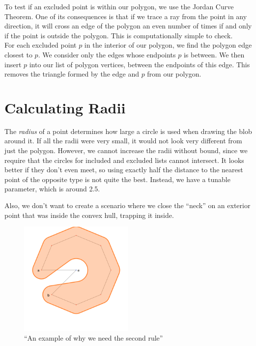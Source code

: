 \documentclass[paper=a4, fontsize=11pt]{scrartcl} %
\numberwithin{equation}{section} %
\numberwithin{figure}{section} %
\numberwithin{table}{section} %
\begin{document}
To test if an excluded point is within our polygon, we use the Jordan Curve
Theorem. One of its consequences is that if we trace a ray from the point in any
direction, it will cross an edge of the polygon an even number of times if and
only if the point is outside the polygon.  This is computationally simple to
check. \\

For each excluded point $p$ in the interior of our polygon, we find the polygon
edge closest to $p$. We consider only the edges whose endpoints $p$ is between.
We then insert $p$ into our list of polygon vertices, between the endpoints of
this edge. This removes the triangle formed by the edge and $p$ from our
polygon.


\section{Calculating Radii}
The \textit{radius} of a point determines how large a circle is used when
drawing the blob around it.  If all the radii were very small, it would not
look very different from just the polygon.  However, we cannot increase the
radii without bound, since we require that the circles for included and
excluded lists cannot intersect.  It looks better if they don't even meet,
so using exactly half the distance to the nearest point of the opposite type
is not quite the best.
Instead, we have a tunable parameter,
which is around 2.5. %

Also, we don't want to create a scenario where we close the ``neck''
on an exterior point that was inside the convex hull, trapping it inside.

\begin{figure}[h]
\includegraphics[width=0.5\textwidth]{torus_bitten}
\centering
\caption{``An example of why we need the second rule''}
\label{fig:neck}
\end{figure}
\end{document}
